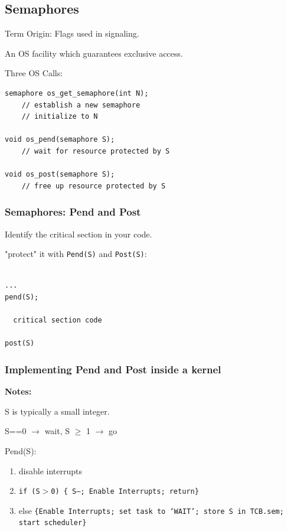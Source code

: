 \documentclass{article}	%
\begin{document}
\subsection{Semaphores}

Term Origin: Flags used in signaling.

An OS facility which guarantees exclusive access.

Three OS Calls:

\begin{verbatim}
semaphore os_get_semaphore(int N);
    // establish a new semaphore
    // initialize to N

void os_pend(semaphore S);
    // wait for resource protected by S

void os_post(semaphore S);
    // free up resource protected by S

\end{verbatim}


\subsubsection{Semaphores: Pend and Post}

Identify the critical section in your code.

"protect" it with {\tt Pend(S)} and {\tt Post(S)}:
\begin{verbatim}

...
pend(S);

  critical section code

post(S)
\end{verbatim}



\subsubsection{Implementing Pend and Post inside a kernel}
{\bf Notes:   }

S is typically a small integer.

S==0 $\to$ wait,  S $\geq$ 1 $\to$ go


Pend(S):
\begin{enumerate}
  \item disable interrupts
  \item {\tt if (S$>$0) \{ S--; Enable Interrupts; return\}}
  \item else {\tt \{Enable Interrupts; set task to `WAIT'; store S in TCB.sem;  start scheduler\}}
\end{enumerate}
\end{document}
